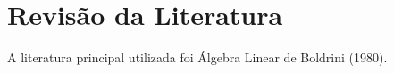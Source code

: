 \chapter{Revisão da Literatura}
A literatura principal utilizada foi Álgebra Linear de Boldrini (1980).
